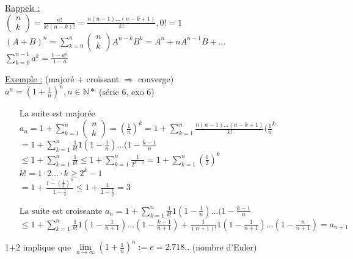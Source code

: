 \documentclass[12pt,a4paper]{article}
\newcommand{\limite}{\lim\limits_}
\newcommand{\ninf}{\ensuremath{n \to \infty}}
\begin{document}
{\begin{boite}
\underline{Rappels :}\\
$\begin{pmatrix}
n \\ 
k
\end{pmatrix}
= \frac{n!}{k!(n-k)!} = \frac{n(n-1)...(n-k+1)}{k!}, 0! = 1$\\
$(A+B)^n = \sum^{n}_{k=0} \begin{pmatrix}
n \\ 
k
\end{pmatrix}
A^{n-k}B^k = A^n + nA^{n-1}B+...$\\
$\sum^{n-1}_{k=0}a^k = \frac{1-a^n}{1-a}$
\end{boite}
\underline{Exemple :} (majoré + croissant $\Rightarrow$ converge)\\
$a^n = (1 + \frac{1}{n})^n, n \in \mathbb{N*}$ (série 6, exo 6)\\
\begin{enumerate}
\item[La suite est majorée] $a_n = 1 + \sum_{k=1}^{n} \begin{pmatrix}
n\\
k
\end{pmatrix}
=(\frac{1}{n})^k = 1 + \sum_{k=1}^n \frac{n(n-1)...(n-k+1)}{k!}(\frac{1}{n}^k$\\
$=1 + \sum_{k=1}^n\frac{1}{k!} 1(1-\frac{1}{n})...(1- \frac{k-1}{n}$\\
$\leq 1 + \sum_{k=1}^n \frac{1}{k!} \leq 1 + \sum_{k=1}^n \frac{1}{2^{ k-1}} = 1 + \sum_{k=1}^n (\frac{1}{2})^k$\\
$k! = 1\cdot 2...\cdot k \geq 2^k-1$\\
$=1 +  \frac{1-(\frac{1}{2})^n}{1 - \frac{1}{2}} \leq 1 + \frac{1}{1- \frac{1}{2}} = 3$
\item[La suite est croissante] $a_n = 1 + \sum_{k=1}^n \frac{1}{k!} 1 (1-\frac{1}{n})...(1-\frac{k-1}{n}$\\
$\leq 1 + \sum_{k=1}^n \frac{1}{k!} 1(1-\frac{1}{n+1})...(1-\frac{k-1}{n+1}) + \frac{1}{(n+1)!}1(1-\frac{1}{n+1})...(1-\frac{n}{n+1}) = a_{n+1}$
\end{enumerate}
1+2  implique que $\limite{\ninf} (1+\frac{1}{n})^n := e = 2.718..$ (nombre d'Euler)
}
\end{document}
